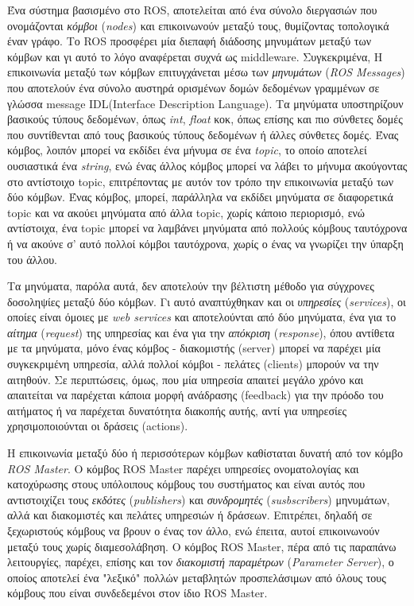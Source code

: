 \bigskip
Ένα σύστημα βασισμένο στο ROS, αποτελείται από ένα σύνολο διεργασιών που ονομάζονται \textit{κόμβοι} (\textit{nodes}) και επικοινωνούν μεταξύ τους, θυμίζοντας τοπολογικά έναν γράφο. Το ROS προσφέρει μία διεπαφή διάδοσης μηνυμάτων μεταξύ των κόμβων και γι αυτό το λόγο αναφέρεται συχνά ως middleware. Συγκεκριμένα, Η επικοινωνία μεταξύ των κόμβων επιτυγχάνεται μέσω των \textit{μηνυμάτων} (\textit{ROS Messages}) που αποτελούν ένα σύνολο αυστηρά ορισμένων δομών δεδομένων γραμμένων σε γλώσσα message IDL(Interface Description Language). Τα μηνύματα υποστηρίζουν βασικούς τύπους δεδομένων, όπως \textit{int}, \textit{float} κοκ, όπως επίσης και πιο σύνθετες δομές που συντίθενται από τους βασικούς τύπους δεδομένων ή άλλες σύνθετες δομές. Ένας κόμβος, λοιπόν μπορεί να εκδίδει ένα μήνυμα σε ένα \textit{topic}, το οποίο αποτελεί ουσιαστικά ένα \textit{string}, ενώ ένας άλλος κόμβος μπορεί να λάβει το μήνυμα ακούγοντας στο αντίστοιχο topic, επιτρέποντας με αυτόν τον τρόπο την επικοινωνία μεταξύ των δύο κόμβων. Ένας κόμβος, μπορεί, παράλληλα να εκδίδει μηνύματα σε διαφορετικά topic και να ακούει μηνύματα από άλλα topic, χωρίς κάποιο περιορισμό, ενώ αντίστοιχα, ένα topic μπορεί να λαμβάνει μηνύματα από πολλούς κόμβους ταυτόχρονα ή να ακούνε σ' αυτό πολλοί κόμβοι ταυτόχρονα, χωρίς ο ένας να γνωρίζει την ύπαρξη του άλλου.

\bigskip
Τα μηνύματα, παρόλα αυτά, δεν αποτελούν την βέλτιστη μέθοδο για σύγχρονες δοσοληψίες μεταξύ δύο κόμβων. Γι αυτό αναπτύχθηκαν και οι \textit{υπηρεσίες} (\textit{services}), οι οποίες είναι όμοιες με \textit{web services} και αποτελούνται από δύο μηνύματα, ένα για το \textit{αίτημα} (\textit{request}) της υπηρεσίας και ένα για την \textit{απόκριση} (\textit{response}), όπου αντίθετα με τα μηνύματα, μόνο ένας κόμβος - διακομιστής (server) μπορεί να παρέχει μία συγκεκριμένη υπηρεσία, αλλά πολλοί κόμβοι - πελάτες (clients) μπορούν να την αιτηθούν. Σε περιπτώσεις, όμως, που μία υπηρεσία απαιτεί μεγάλο χρόνο και απαιτείται να παρέχεται κάποια μορφή ανάδρασης (feedback) για την πρόοδο του αιτήματος ή να παρέχεται δυνατότητα διακοπής αυτής, αντί για υπηρεσίες χρησιμοποιούνται οι δράσεις (actions). 

\bigskip
Η επικοινωνία μεταξύ δύο ή περισσότερων κόμβων καθίσταται δυνατή από τον κόμβο \textit{ROS Master}. Ο κόμβος ROS Master παρέχει υπηρεσίες ονοματολογίας και κατοχύρωσης στους υπόλοιπους κόμβους του συστήματος και είναι αυτός που αντιστοιχίζει τους \textit{εκδότες} (\textit{publishers}) και \textit{συνδρομητές} (\textit{susbscribers}) μηνυμάτων, αλλά και διακομιστές και πελάτες υπηρεσιών ή δράσεων. Επιτρέπει, δηλαδή σε ξεχωριστούς κόμβους να βρουν ο ένας τον άλλο, ενώ έπειτα, αυτοί επικοινωνούν μεταξύ τους χωρίς διαμεσολάβηση. Ο κόμβος ROS Master, πέρα από τις παραπάνω λειτουργίες, παρέχει, επίσης και τον \textit{διακομιστή παραμέτρων} (\textit{Parameter Server}), ο οποίος αποτελεί ένα "λεξικό" πολλών μεταβλητών προσπελάσιμων από όλους τους κόμβους που είναι συνδεδεμένοι στον ίδιο ROS Master.

